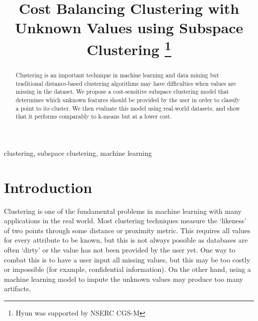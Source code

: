 \documentclass[conference]{IEEEtran}
\begin{document}
\title{Cost Balancing Clustering with Unknown Values using Subspace Clustering
\thanks{Hyun was supported by NSERC CGS-M}
}

\author{
\and
{}
}

\maketitle

\begin{abstract}
Clustering is an important technique in machine learning and data mining
but traditional distance-based clustering algorithms may have difficulties when
values are missing in the dataset. We propose a cost-sensitive
subspace clustering model that determines which unknown features should be 
provided by the user in order to classify a point to its cluster. We then evaluate
this model using real-world datasets, and show that it performs comparably
to k-means but at a lower cost.
\end{abstract}

\begin{IEEEkeywords}
clustering, subspace clustering, machine learning
\end{IEEEkeywords}

\section{Introduction}
Clustering is one of the fundamental problems in machine learning with
many applications in the real world. Most clustering techniques measure the
`likeness' of two points through some distance or proximity metric. This requires
all values for every attribute to be known, but this is not always
possible as databases are often `dirty' or the value has not been provided by
the user yet. One way to combat this is to have a user input all missing
values, but this may be too costly or impossible (for example, confidential
information). On the other hand, using a machine learning model to impute
the unknown values may produce too many artifacts.
\end{document}
